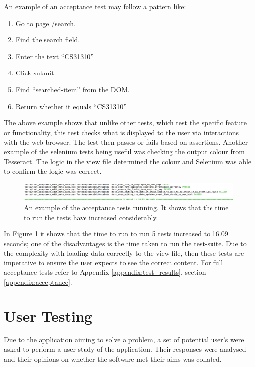 An example of an acceptance test may follow a pattern like:
\begin{enumerate}
  \item Go to page /search.
  \item Find the search field.
  \item Enter the text ``CS31310''
  \item Click submit
  \item Find ``searched-item'' from the DOM.
  \item Return whether it equals ``CS31310''
\end{enumerate}

The above example shows that unlike other tests, which test the specific feature or functionality, this test checks what is displayed to the user via interactions with the web browser. The test then passes or fails based on assertions. Another example of the selenium tests being useful was checking the output colour from Tesseract. The logic in the view file determined the colour and Selenium was able to confirm the logic was correct.

\begin{figure}[h!]
  \centering
  \includegraphics[width=\textwidth]{images/acceptance_test_1}
  \caption{An example of the acceptance tests running. It shows that the time to run the tests have increased considerably.}
  \label{fig:acceptance_test_1}
\end{figure}

In Figure \ref{fig:acceptance_test_1} it shows that the time to run to run 5 tests increased to 16.09 seconds; one of the disadvantages is the time taken to run the test-suite. Due to the complexity with loading data correctly to the view file, then these tests are imperative to ensure the user expects to see the correct content. For full acceptance tests refer to Appendix \ref{appendix:test_results}, section \ref{appendix:acceptance}.

\section{User Testing}
Due to the application aiming to solve a problem, a set of potential user's were asked to perform a user study of the application. Their responses were analysed and their opinions on whether the software met their aims was collated.

